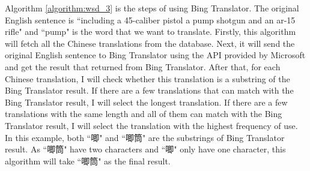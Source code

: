 
Algorithm \ref{algorithm:wsd_3} is the steps of using Bing Translator. The original English sentence is ``including a 45-caliber pistol a pump shotgun and an ar-15 rifle" and ``pump" is the word that we want to translate. Firstly, this algorithm will fetch all the Chinese translations from the database. Next, it will send the original English sentence to Bing Translator using the API provided by Microsoft and get the result that returned from Bing Translator. After that, for each Chinese translation, I will check whether this translation is a substring of the Bing Translator result. If there are a few translations that can match with the Bing Translator result, I will select the longest translation. If there are a few translations with the same length and all of them can match with the Bing Translator result, I will select the translation with the highest frequency of use. In this example, both ``唧" and ``唧筒" are the substrings of Bing Translator result. As ``唧筒" have two characters and ``唧" only have one character, this algorithm will take ``唧筒" as the final result.


